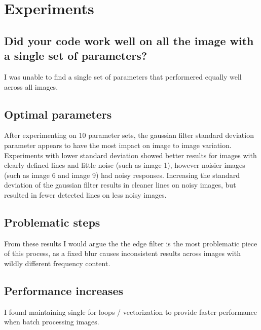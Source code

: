 \documentclass[12pt]{article}
\begin{document}
\subsection{}
\newpage
\subsection{}
\newpage
\subsection{}

\newpage
\section{Experiments}
\subsection{Did your code work well on all the image with a single set of parameters? }
I was unable to find a single set of parameters that performered equally well across all images.

\newpage
\subsection{Optimal parameters}
After experimenting on 10 parameter sets, the gaussian filter standard deviation parameter appears to have the most impact on image to image variation. Experiments with lower standard deviation showed better results for images with clearly defined lines and little noise (such as image 1), however noisier images (such as image 6 and image 9) had noisy responses.
Increasing the standard deviation of the gaussian filter results in cleaner lines on noisy images, but resulted in fewer detected lines on less noisy images.

\newpage
\subsection{Problematic steps}
From these results I would argue the the edge filter is the most problematic piece of this process, as a fixed blur causes inconsistent results across images with wildly different frequency content.

\newpage
\subsection{Performance increases}
I found maintaining single for loops / vectorization to provide faster performance when batch processing images.
\end{document}
